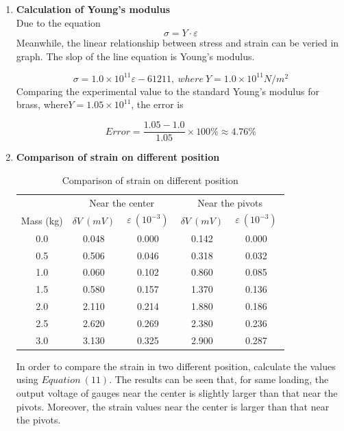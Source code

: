 \documentclass[11pt,a4paper,twoside]{article}
\begin{document}
\begin{enumerate}
\item
\textbf{Calculation of Young's modulus}\\
Due to the equation 
\begin{equation}
\sigma=Y\cdot \varepsilon
\end{equation}
Meanwhile, the linear relationship between stress and strain can be veried in graph. The slop of the line equation is Young's modulus. 

\begin{equation*}
\sigma=1.0\times 10^{11} \varepsilon-61211,\ where \ Y=1.0\times 10^{11} N/m^{2} 
\end{equation*}
Comparing the experimental value to the standard Young's modulus for brass, where$ Y=1.05\times 10^{11}$, the error is 

\begin{equation*}
Error=\frac{1.05-1.0}{1.05}\times 100\% \approx 4.76\%
\end{equation*}


\item 
\textbf{Comparison of strain on different position}\\

\begin{table}[!h]
	\centering
	\begin{tabular}{|c|c|c|c|c|}
		\hline
		\ &\multicolumn{2}{|c|}{Near the center} &\multicolumn{2}{|c|}{Near the pivots}\\
		\cline{2-5}
		Mass (kg) & $\delta V \ (mV)$ & $\ \varepsilon \ (10^{-3}) \ $ & $\delta V \ (mV)$& $\ \varepsilon \ (10^{-3}) \ $  \\
		\hline\hline
		0.0 & 0.048 & 0.000 &0.142 & 0.000\\
		\hline
		0.5 & 0.506 & 0.046 &0.318&0.032\\
		\hline
		1.0 & 0.060 & 0.102 &0.860 &0.085\\
		\hline
		1.5 & 0.580 & 0.157 &1.370 &0.136\\
		\hline
		2.0 & 2.110 & 0.214 &1.880 &0.186\\
		\hline
		2.5 & 2.620 & 0.269 &2.380 &0.236\\
		\hline
		3.0 & 3.130 & 0.325 &2.900 &0.287\\
		\hline
		
	\end{tabular}
	\caption{Comparison of strain on different position}
	\label{t5}
\end{table}

In order to compare the strain in two different position, calculate the values using $Equation\ (11)$. The results can be seen that, for same loading, the output voltage of gauges near the center is slightly larger than that near the pivots. Moreover, the strain values near the center is larger than that near the pivots. 
\end{enumerate}
\end{document}
